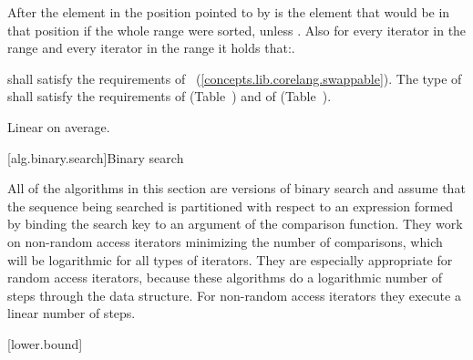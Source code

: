 \begin{itemdescr}
\pnum
After
the element in the position pointed to by 
is the element that would be
in that position if the whole range were sorted, unless .
Also for every iterator
in the range
and every iterator
in the range
it holds that:.

\begin{removedblock}
\pnum
\requires
{} shall satisfy the requirements of
~(\ref{concepts.lib.corelang.swappable}). The type
of  shall satisfy the requirements of
 (Table~) and of
 (Table~).
\end{removedblock}

\pnum
\complexity
Linear on average.
\end{itemdescr}

[alg.binary.search]{Binary search}

\pnum
All of the algorithms in this section are versions of binary search
and assume that the sequence being searched is partitioned with respect to
an expression formed by binding the search key to an argument of the
 comparison function.
They work on non-random access iterators minimizing the number of comparisons,
which will be logarithmic for all types of iterators.
They are especially appropriate for random access iterators,
because these algorithms do a logarithmic number of steps
through the data structure.
For non-random access iterators they execute a linear number of steps.

[lower.bound]{}

